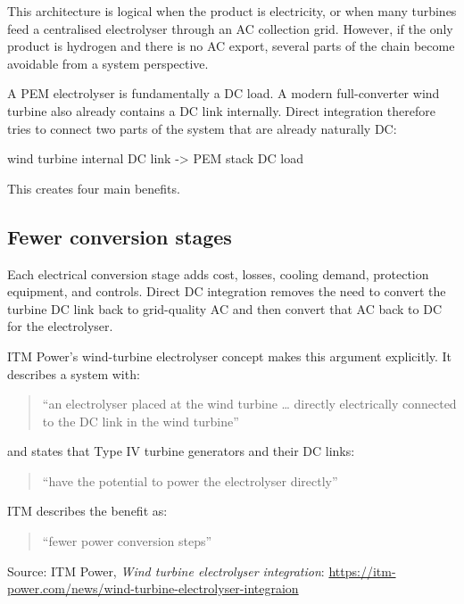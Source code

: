 \documentclass[
  letterpaper,
  DIV=11,
  numbers=noendperiod]{scrartcl}
\newenvironment{Shaded}{\begin{snugshade}}{\end{snugshade}}
\newcommand{\NormalTok}[1]{\textcolor[rgb]{0.00,0.23,0.31}{#1}}
\begin{document}
This architecture is logical when the product is electricity, or when
many turbines feed a centralised electrolyser through an AC collection
grid. However, if the only product is hydrogen and there is no AC
export, several parts of the chain become avoidable from a system
perspective.

A PEM electrolyser is fundamentally a DC load. A modern full-converter
wind turbine also already contains a DC link internally. Direct
integration therefore tries to connect two parts of the system that are
already naturally DC:

\begin{Shaded}
\begin{Highlighting}[]
\NormalTok{wind turbine internal DC link {-}\textgreater{} PEM stack DC load}
\end{Highlighting}
\end{Shaded}

This creates four main benefits.

\subsection{Fewer conversion stages}\label{fewer-conversion-stages}

Each electrical conversion stage adds cost, losses, cooling demand,
protection equipment, and controls. Direct DC integration removes the
need to convert the turbine DC link back to grid-quality AC and then
convert that AC back to DC for the electrolyser.

ITM Power's wind-turbine electrolyser concept makes this argument
explicitly. It describes a system with:

\begin{quote}
``an electrolyser placed at the wind turbine \ldots{} directly
electrically connected to the DC link in the wind turbine''
\end{quote}

and states that Type IV turbine generators and their DC links:

\begin{quote}
``have the potential to power the electrolyser directly''
\end{quote}

ITM describes the benefit as:

\begin{quote}
``fewer power conversion steps''
\end{quote}

Source: ITM Power, \emph{Wind turbine electrolyser integration}:
\url{https://itm-power.com/news/wind-turbine-electrolyser-integraion}
\end{document}
